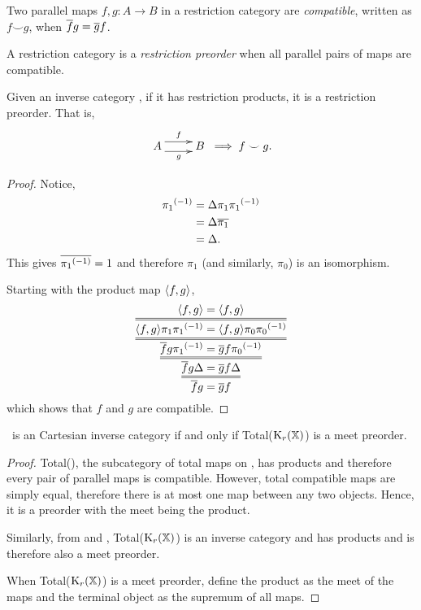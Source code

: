 \begin{definition}
  Two parallel maps $f,g:A \to B$ in a restriction category are \emph{compatible}, written as $f
  \smile g$, when $\overline{f} g = \overline{g} f$.
\end{definition}
\begin{definition}\label{def:restrictionpreorder}
  A restriction category \X is a \emph{restriction preorder} when all parallel pairs of maps are
  compatible.
\end{definition}
\begin{lemma}\label{lem:an_inverse_category_with_products_is_a_restriction_preorder}
  Given an inverse category \X, if it has restriction products, it is a restriction preorder. That
  is,
  \[
    \xymatrix {
      A  \ar@<1ex>[r]^{f} \ar@<-1ex>[r]_{g} &B
    }
    \implies f \smile g.
  \]
\end{lemma}
\begin{proof}
  Notice,
  \begin{align*}
    {\pi_1}^{(-1)} & = \Delta \pi_1 {\pi_1}^{(-1)}\\
    &=\Delta \overline{\pi_1}\\
    &=\Delta.
  \end{align*}
  This gives $\overline{{\pi_1}^{(-1)}} = 1$ and therefore $\pi_1$ (and similarly, $\pi_0$) is an
  isomorphism.

  Starting with the product map $\langle f,g\rangle$,
  \[
    \infer={\restr{f}g = \restr{g}f}
    {\infer={\restr{f}g\Delta = \restr{g}f\Delta}
    {\infer={\restr{f}g\inv{\pi_1} = \restr{g}f\inv{\pi_0}}
    {\infer={\<f,g\>\pi_1 \inv{\pi_1} = \<f,g\>\pi_0 \inv{\pi_0}}
    {\<f,g\> = \<f,g\>}}}}
  \]
  which shows that $f$ and $g$ are compatible.
\end{proof}

\begin{corollary}
  \X\ is an Cartesian inverse category if and only if Total($\text{K}_{r}(\mathbb{X})$) is a meet preorder.
\end{corollary}

\begin{proof}
  Total(\X), the subcategory of total maps on \X, has products and therefore every pair of parallel
  maps is compatible. However, total compatible maps are simply equal, therefore there is at most
  one map between any two objects. Hence, it is a preorder with the meet being the product.

  Similarly, from \cite{cockett2002:restcategories1} and \cite{cockettlack2004:restcategories3},
  Total($\text{K}_{r}(\mathbb{X})$) is an inverse category and has products and is therefore also a meet
  preorder.

  When Total($\text{K}_{r}(\mathbb{X})$) is a meet preorder, define the product as the meet of the maps and the
  terminal object as the supremum of all maps.
\end{proof}

